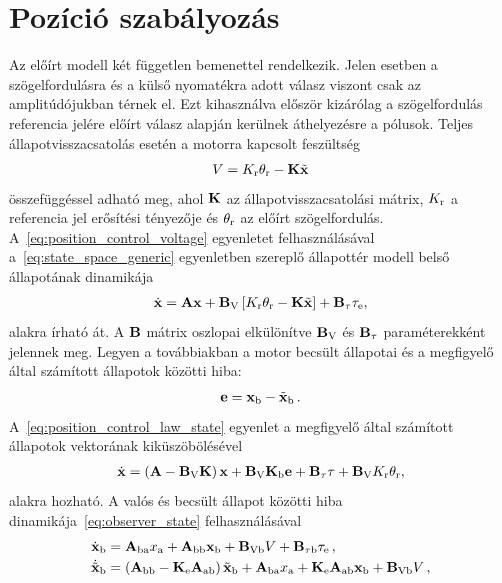 \section{Pozíció szabályozás}
Az előírt modell két független bemenettel rendelkezik. Jelen esetben a szögelfordulásra és a 
külső nyomatékra adott válasz viszont csak az amplitúdójukban térnek el. Ezt kihasználva először kizárólag a szögelfordulás referencia jelére előírt válasz alapján 
kerülnek áthelyezésre a pólusok. Teljes állapotvisszacsatolás esetén a motorra kapcsolt feszültség
\begin{align}\label{eq:position_control_voltage}
    V = K_{\mathrm{r}} \theta_{\mathrm{r}} -\mathbf{K} \tilde{\mathbf{x}}
\end{align}
összefüggéssel adható meg, 
ahol $\mathbf{K}$ az állapotvisszacsatolási mátrix, 
$K_{\mathrm{r}}$ a referencia jel erősítési tényezője és
$\theta_{\mathrm{r}}$ az előírt szögelfordulás. A~\eqref{eq:position_control_voltage} egyenletet felhasználásával
a~\eqref{eq:state_space_generic} egyenletben szereplő állapottér modell belső állapotának dinamikája
\begin{align}\label{eq:position_control_law_state}
    \dot{\mathbf{x}} = \mathbf{A} \mathbf{x} + \mathbf{B}_{\mathrm{V}}\left[K_{\mathrm{r}} \theta_{\mathrm{r}} - \mathbf{K} \tilde{\mathbf{x}}\right] + \mathbf{B}_{\mathrm{\tau}} \tau_{\mathrm{e}},
\end{align}
alakra írható át. A $\mathbf{B}$ mátrix oszlopai elkülönítve $\mathbf{B}_{\mathrm{V}}$ és $\mathbf{B}_{\mathrm{\tau}}$ paraméterekként jelennek meg.
Legyen a továbbiakban a motor becsült állapotai és a megfigyelő által számított állapotok közötti hiba:
\begin{align}
    \mathbf{e} = \mathbf{x}_{\mathrm{b}} - \tilde{\mathbf{x}}_{\mathrm{b}}\,.
\end{align}
A~\eqref{eq:position_control_law_state} egyenlet a megfigyelő által számított állapotok 
vektorának kiküszöbölésével
\begin{align}
    \dot{\mathbf{x}} = \left(\mathbf{A} - \mathbf{B}_{\mathrm{V}} \mathbf{K}\right) \mathbf{x} + 
    \mathbf{B}_{\mathrm{V}} \mathbf{K}_{\mathrm{b}} \mathbf{e} + 
    \mathbf{B}_{\mathrm{\tau}} \tau + 
    \mathbf{B}_{\mathrm{V}} K_{\mathrm{r}} \theta_{\mathrm{r}},
\end{align}
alakra hozható. A valós és becsült állapot közötti hiba dinamikája~\eqref{eq:observer_state} felhasználásával
\begin{equation}
    \begin{split}
    \dot{\mathbf{x}}_{\mathrm{b}} &= \mathbf{A}_{\mathrm{ba}} x_{\mathrm{a}} + \mathbf{A}_{\mathrm{bb}} \mathbf{x}_{\mathrm{b}} + 
    \mathbf{B}_{\mathrm{Vb}} V + \mathbf{B}_{\mathrm{\tau b}} \tau_{\mathrm{e}}\,,\\
    \dot{\tilde{\mathbf{x}}}_{\mathrm{b}} &= \left(\mathbf{A}_{\mathrm{bb}} - \mathbf{K}_{\mathrm{e}} \mathbf{A}_{\mathrm{ab}}\right) \tilde{\mathbf{x}}_{\mathrm{b}} +
    \mathbf{A}_{\mathrm{ba}} x_{\mathrm{a}} +
    \mathbf{K}_{\mathrm{e}} \mathbf{A}_{\mathrm{ab}} \mathbf{x}_{\mathrm{b}} +
    \mathbf{B}_{\mathrm{Vb}} V\,,
    \end{split}
\end{equation}
